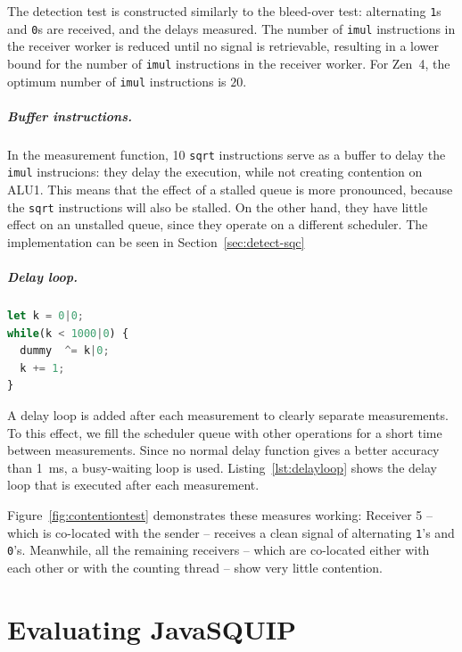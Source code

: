 \documentclass[11pt,
  titlepage=false,
  parskip=half,      %
]{scrreprt}
\begin{document}
The detection test is constructed similarly to the bleed-over test:
alternating \texttt{1}s and \texttt{0}s are received, and the delays measured.
The number of \texttt{imul} instructions in the receiver worker is reduced until no signal is retrievable,
resulting in a lower bound for the number of \texttt{imul} instructions in the receiver worker.
For Zen~4, the optimum number of \texttt{imul} instructions is $20$.

\paragraph{Buffer instructions.}
In the measurement function, 10 \texttt{sqrt} instructions serve as a buffer to delay the \texttt{imul} instrucions:
they delay the execution, while not creating contention on ALU1.
This means that the effect of a stalled queue is more pronounced, because the \texttt{sqrt} instructions will also be stalled.
On the other hand, they have little effect on an unstalled queue, since they operate on a different scheduler.
The implementation can be seen in Section~\ref{sec:detect-sqc}

\paragraph{Delay loop.}
\begin{lstlisting}[float,caption={The delay loop after a measurement},label={lst:delayloop},language=JavaScript]
let k = 0|0;
while(k < 1000|0) {
  dummy  ^= k|0;
  k += 1;
}
\end{lstlisting}

A delay loop is added after each measurement to clearly separate measurements.
To this effect, we fill the scheduler queue with other operations for a short time between measurements.
Since no normal delay function gives a better accuracy than 1~ms, a busy-waiting loop is used.
Listing~\ref{lst:delayloop} shows the delay loop that is executed after each measurement.


Figure~\ref{fig:contentiontest} demonstrates these measures working:
Receiver 5 -- which is co-located with the sender -- receives a clean signal of alternating \texttt{1}'s and \texttt{0}'s.
Meanwhile, all the remaining receivers -- which are co-located either with each other or with the counting thread -- show very little contention.


\chapter{Evaluating JavaSQUIP}
\label{ch:evaluation}
\end{document}
